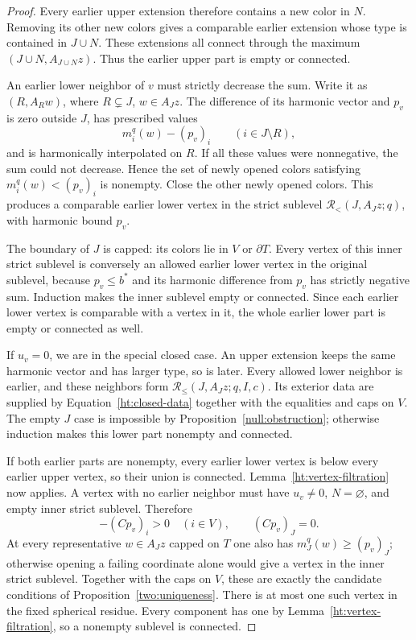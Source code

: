 \begin{proof}
Every earlier upper extension therefore contains a new color in \(N\).
Removing its other new colors gives a comparable earlier extension
whose type is contained in \(J\cup N\).  These extensions all connect
through the maximum \((J\cup N,A_{J\cup N}z)\).  Thus the earlier upper
part is empty or connected.

An earlier lower neighbor of \(v\) must strictly decrease the sum.
Write it as \((R,A_Rw)\), where \(R\subsetneq J\), \(w\in A_Jz\).
The difference of its harmonic vector and \(p_v\) is zero outside \(J\),
has prescribed values
\[
 m_i^q(w)-(p_v)_i\qquad(i\in J\setminus R),
\]
and is harmonically interpolated on \(R\).
If all these values were nonnegative, the sum could not decrease.
Hence the set of newly opened colors satisfying
\(m_i^q(w)<(p_v)_i\) is nonempty.  Close the other newly opened colors.
This produces a comparable earlier lower vertex in the strict sublevel
\(\mathcal R_{<}(J,A_Jz;q)\), with harmonic bound \(p_v\).

The boundary of \(J\) is capped: its colors lie in \(V\) or
\(\partial T\).  Every vertex of this inner strict sublevel is conversely
an allowed earlier lower vertex in the original sublevel, because
\(p_v\le b^*\) and its harmonic difference from \(p_v\) has strictly
negative sum.  Induction makes the inner sublevel empty or connected.
Since each earlier lower vertex is comparable with a vertex in it,
the whole earlier lower part is empty or connected as well.

If \(u_v=0\), we are in the special closed case.  An upper extension
keeps the same harmonic vector and has larger type, so is later.
Every allowed lower neighbor is earlier, and these neighbors form
\(\mathcal R_{\le}(J,A_Jz;q,I,c)\).  Its exterior data are supplied by
Equation~\eqref{ht:closed-data} together with the equalities and caps on
\(V\).  The empty \(J\) case is impossible by
Proposition~\ref{null:obstruction}; otherwise induction makes this lower
part nonempty and connected.

If both earlier parts are nonempty, every earlier lower vertex is below
every earlier upper vertex, so their union is connected.
Lemma~\ref{ht:vertex-filtration} now applies.
A vertex with no earlier neighbor must have \(u_v\ne0\), \(N=\varnothing\),
and empty inner strict sublevel.  Therefore
\[
 -(Cp_v)_i>0\quad(i\in V),\qquad (Cp_v)_J=0.
\]
At every representative \(w\in A_Jz\) capped on \(T\) one also has
\(m_J^q(w)\ge(p_v)_J\); otherwise opening a failing coordinate alone
would give a vertex in the inner strict sublevel.
Together with the caps on \(V\), these are exactly the candidate
conditions of Proposition~\ref{two:uniqueness}.  There is at most one
such vertex in the fixed spherical residue.
Every component has one by Lemma~\ref{ht:vertex-filtration}, so a
nonempty sublevel is connected.
\end{proof}

